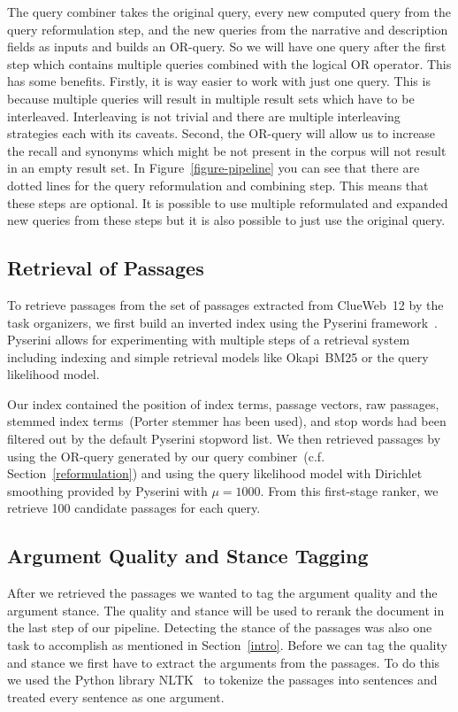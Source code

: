 The query combiner takes the original query, every new computed query from the query reformulation step, and the new queries from the narrative and description fields as inputs and builds an OR-query.
So we will have one query after the first step which contains multiple queries combined with the logical OR operator.
This has some benefits.
Firstly, it is way easier to work with just one query.
This is because multiple queries will result in multiple result sets which have to be interleaved.
Interleaving is not trivial and there are multiple interleaving strategies each with its caveats.
Second, the OR-query will allow us to increase the recall and synonyms which might be not present in the corpus will not result in an empty result set.
In Figure~\ref{figure-pipeline} you can see that there are dotted lines for the query reformulation and combining step.
This means that these steps are optional.
It is possible to use multiple reformulated and expanded new queries from these steps but it is also possible to just use the original query.

\subsection{Retrieval of Passages}\label{retrieval}

To retrieve passages from the set of passages extracted from ClueWeb~12 by the task organizers, we first build an inverted index using the Pyserini framework~\cite{LinMLYPN2021}.
Pyserini allows for experimenting with multiple steps of a retrieval system including indexing and simple retrieval models like Okapi~BM25 or the query likelihood model.

Our index contained the position of index terms, passage vectors, raw passages, stemmed index terms~(Porter stemmer has been used), and stop words had been filtered out by the default Pyserini stopword list.
We then retrieved passages by using the OR-query generated by our query combiner~(c.f. Section~\ref{reformulation}) and using the query likelihood model with Dirichlet smoothing provided by Pyserini with \( \mu = 1000 \).
From this first-stage ranker, we retrieve 100 candidate passages for each query.

\subsection{Argument Quality and Stance Tagging}

After we retrieved the passages we wanted to tag the argument quality and the argument stance.
The quality and stance will be used to rerank the document in the last step of our pipeline.
Detecting the stance of the passages was also one task to accomplish as mentioned in Section~\ref{intro}.
Before we can tag the quality and stance we first have to extract the arguments from the passages.
To do this we used the Python library NLTK~\cite{BirdLK2009} to tokenize the passages into sentences and treated every sentence as one argument.

